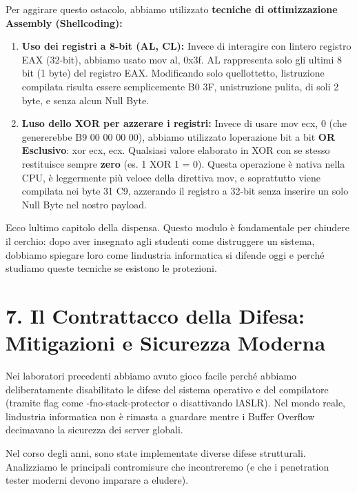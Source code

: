 \documentclass[11pt,a4paper]{article}
\begin{document}
Per aggirare questo ostacolo, abbiamo utilizzato \textbf{tecniche di
ottimizzazione Assembly (Shellcoding):}

\begin{enumerate}
\def\labelenumi{\arabic{enumi}.}
\item
  \textbf{Uso dei registri a 8-bit (AL, CL):} Invece di interagire con
  l\textquotesingle intero registro EAX (32-bit), abbiamo usato mov al,
  0x3f. AL rappresenta solo gli ultimi 8 bit (1 byte) del registro EAX.
  Modificando solo quell\textquotesingle ottetto,
  l\textquotesingle istruzione compilata risulta essere semplicemente B0
  3F, un\textquotesingle istruzione pulita, di soli 2 byte, e senza
  alcun Null Byte.
\item
  \textbf{L\textquotesingle uso dello XOR per azzerare i registri:}
  Invece di usare mov ecx, 0 (che genererebbe B9 00 00 00 00), abbiamo
  utilizzato l\textquotesingle operazione bit a bit \textbf{OR
  Esclusivo}: xor ecx, ecx. Qualsiasi valore elaborato in XOR con se
  stesso restituisce sempre \textbf{zero} (es. 1 XOR 1 = 0). Questa
  operazione è nativa nella CPU, è leggermente più veloce della
  direttiva mov, e soprattutto viene compilata nei byte 31 C9, azzerando
  il registro a 32-bit senza inserire un solo Null Byte nel nostro
  payload.
\end{enumerate}

Ecco l\textquotesingle ultimo capitolo della dispensa. Questo modulo è
fondamentale per chiudere il cerchio: dopo aver insegnato agli studenti
come distruggere un sistema, dobbiamo spiegare loro come
l\textquotesingle industria informatica si difende oggi e perché
studiamo queste tecniche se esistono le protezioni.

\section{7. Il Contrattacco della Difesa: Mitigazioni e Sicurezza
Moderna}\label{il-contrattacco-della-difesa-mitigazioni-e-sicurezza-moderna}

Nei laboratori precedenti abbiamo avuto gioco facile perché abbiamo
deliberatamente disabilitato le difese del sistema operativo e del
compilatore (tramite flag come -fno-stack-protector o disattivando
l\textquotesingle ASLR). Nel mondo reale, l\textquotesingle industria
informatica non è rimasta a guardare mentre i Buffer Overflow decimavano
la sicurezza dei server globali.

Nel corso degli anni, sono state implementate diverse difese
strutturali. Analizziamo le principali contromisure che incontreremo (e
che i penetration tester moderni devono imparare a eludere).
\end{document}
